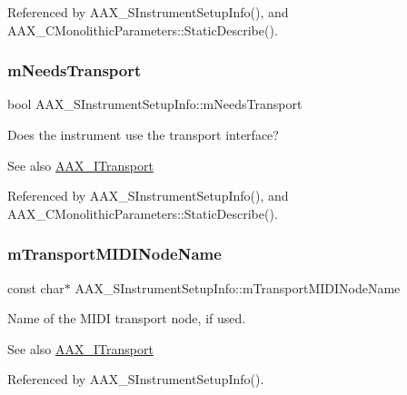 Referenced by A\+A\+X\+\_\+\+S\+Instrument\+Setup\+Info(), and A\+A\+X\+\_\+\+C\+Monolithic\+Parameters\+::\+Static\+Describe().

\mbox{\label{a01957_af76fbb79466b45d7f48153e7951e843a}} 
\subsubsection{\texorpdfstring{mNeedsTransport}{mNeedsTransport}}
{\footnotesize\ttfamily bool A\+A\+X\+\_\+\+S\+Instrument\+Setup\+Info\+::m\+Needs\+Transport}



Does the instrument use the transport interface? 

\begin{DoxySeeAlso}{See also}
\mbox{\hyperlink{a01885}{A\+A\+X\+\_\+\+I\+Transport}} 
\end{DoxySeeAlso}


Referenced by A\+A\+X\+\_\+\+S\+Instrument\+Setup\+Info(), and A\+A\+X\+\_\+\+C\+Monolithic\+Parameters\+::\+Static\+Describe().

\mbox{\label{a01957_a8e96dc4ba78132184cfff16720e72bde}} 
\subsubsection{\texorpdfstring{mTransportMIDINodeName}{mTransportMIDINodeName}}
{\footnotesize\ttfamily const char$\ast$ A\+A\+X\+\_\+\+S\+Instrument\+Setup\+Info\+::m\+Transport\+M\+I\+D\+I\+Node\+Name}



Name of the M\+I\+DI transport node, if used. 

\begin{DoxySeeAlso}{See also}
\mbox{\hyperlink{a01885}{A\+A\+X\+\_\+\+I\+Transport}} 
\end{DoxySeeAlso}


Referenced by A\+A\+X\+\_\+\+S\+Instrument\+Setup\+Info().

\mbox{\label{a01957_a58815894e89a352e5013046cbfa2a834}} 
